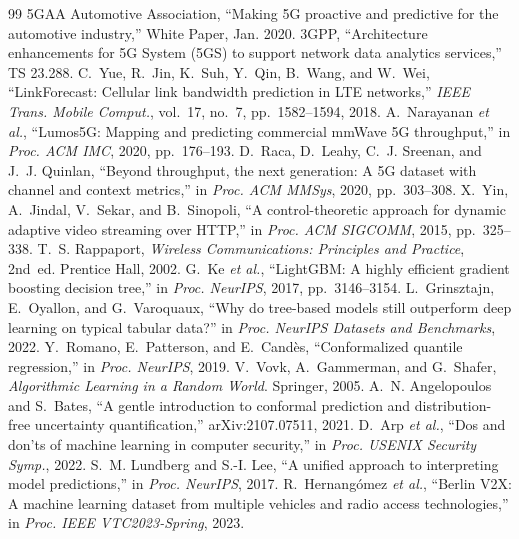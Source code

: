 \documentclass[10pt,a4paper,twocolumn]{article}
\begin{document}
\begin{thebibliography}{99}
\footnotesize
\setlength{\itemsep}{1pt}
 5GAA Automotive Association, ``Making 5G proactive and predictive for the automotive industry,'' White Paper, Jan. 2020.
 3GPP, ``Architecture enhancements for 5G System (5GS) to support network data analytics services,'' TS 23.288.
 C.~Yue, R.~Jin, K.~Suh, Y.~Qin, B.~Wang, and W.~Wei, ``LinkForecast: Cellular link bandwidth prediction in LTE networks,'' \emph{IEEE Trans. Mobile Comput.}, vol.~17, no.~7, pp.~1582--1594, 2018.
 A.~Narayanan \textit{et al.}, ``Lumos5G: Mapping and predicting commercial mmWave 5G throughput,'' in \emph{Proc. ACM IMC}, 2020, pp.~176--193.
 D.~Raca, D.~Leahy, C.~J. Sreenan, and J.~J. Quinlan, ``Beyond throughput, the next generation: A 5G dataset with channel and context metrics,'' in \emph{Proc. ACM MMSys}, 2020, pp.~303--308.
 X.~Yin, A.~Jindal, V.~Sekar, and B.~Sinopoli, ``A control-theoretic approach for dynamic adaptive video streaming over HTTP,'' in \emph{Proc. ACM SIGCOMM}, 2015, pp.~325--338.
 T.~S. Rappaport, \emph{Wireless Communications: Principles and Practice}, 2nd~ed. Prentice Hall, 2002.
 G.~Ke \textit{et al.}, ``LightGBM: A highly efficient gradient boosting decision tree,'' in \emph{Proc. NeurIPS}, 2017, pp.~3146--3154.
 L.~Grinsztajn, E.~Oyallon, and G.~Varoquaux, ``Why do tree-based models still outperform deep learning on typical tabular data?'' in \emph{Proc. NeurIPS Datasets and Benchmarks}, 2022.
 Y.~Romano, E.~Patterson, and E.~Cand\`es, ``Conformalized quantile regression,'' in \emph{Proc. NeurIPS}, 2019.
 V.~Vovk, A.~Gammerman, and G.~Shafer, \emph{Algorithmic Learning in a Random World}. Springer, 2005.
 A.~N. Angelopoulos and S.~Bates, ``A gentle introduction to conformal prediction and distribution-free uncertainty quantification,'' arXiv:2107.07511, 2021.
 D.~Arp \textit{et al.}, ``Dos and don'ts of machine learning in computer security,'' in \emph{Proc. USENIX Security Symp.}, 2022.
 S.~M. Lundberg and S.-I. Lee, ``A unified approach to interpreting model predictions,'' in \emph{Proc. NeurIPS}, 2017.
 R.~Hernang\'omez \textit{et al.}, ``Berlin V2X: A machine learning dataset from multiple vehicles and radio access technologies,'' in \emph{Proc. IEEE VTC2023-Spring}, 2023.
\end{thebibliography}
\end{document}
